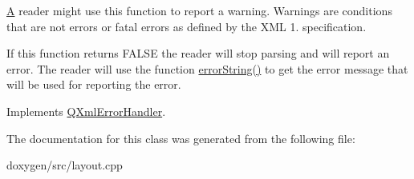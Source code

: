 \mbox{\hyperlink{class_a}{A}} reader might use this function to report a warning. Warnings are conditions that are not errors or fatal errors as defined by the X\+ML 1. specification.

If this function returns F\+A\+L\+SE the reader will stop parsing and will report an error. The reader will use the function \mbox{\hyperlink{class_layout_error_handler_a042664a153147e99f4ee0cb3bdf76418}{error\+String()}} to get the error message that will be used for reporting the error. 

Implements \mbox{\hyperlink{class_q_xml_error_handler_a79ae0cce3316a76b7777c6e90b101afe}{Q\+Xml\+Error\+Handler}}.



The documentation for this class was generated from the following file\+:\begin{DoxyCompactItemize}
\item 
doxygen/src/layout.\+cpp\end{DoxyCompactItemize}
